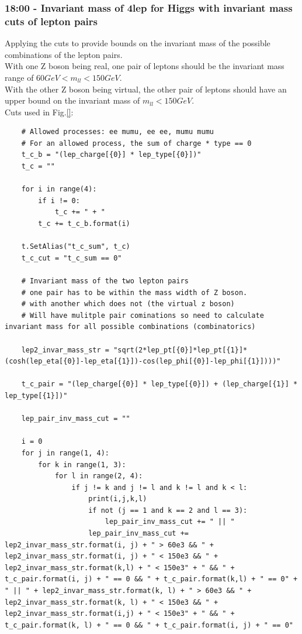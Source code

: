 \subsubsection*{18:00 - Invariant mass of 4lep for Higgs with invariant mass cuts of lepton pairs}
Applying the cuts to provide bounds on the invariant mass of the possible combinations of the lepton pairs.
\\
With one Z boson being real, one pair of leptons should be the invariant mass range of $60 GeV < m_{ll} < 150 GeV$.
\\
With the other Z boson being virtual, the other pair of leptons should have an upper bound on the invariant mass of $m_{ll} < 150 GeV$.
\\
Cuts used in Fig.\ref{}:
\begin{lstlisting}
    # Allowed processes: ee mumu, ee ee, mumu mumu
    # For an allowed process, the sum of charge * type == 0 
    t_c_b = "(lep_charge[{0}] * lep_type[{0}])"  
    t_c = ""
    
    for i in range(4):
        if i != 0:
            t_c += " + "
        t_c += t_c_b.format(i)

    t.SetAlias("t_c_sum", t_c)
    t_c_cut = "t_c_sum == 0"
    
    # Invariant mass of the two lepton pairs 
    # one pair has to be within the mass width of Z boson.
    # with another which does not (the virtual z boson)
    # Will have mulitple pair cominations so need to calculate invariant mass for all possible combinations (combinatorics)

    lep2_invar_mass_str = "sqrt(2*lep_pt[{0}]*lep_pt[{1}]*(cosh(lep_eta[{0}]-lep_eta[{1}])-cos(lep_phi[{0}]-lep_phi[{1}])))"

    t_c_pair = "(lep_charge[{0}] * lep_type[{0}]) + (lep_charge[{1}] * lep_type[{1}])"

    lep_pair_inv_mass_cut = ""

    i = 0
    for j in range(1, 4):
        for k in range(1, 3):
            for l in range(2, 4):
                if j != k and j != l and k != l and k < l:
                    print(i,j,k,l)
                    if not (j == 1 and k == 2 and l == 3):
                        lep_pair_inv_mass_cut += " || "
                    lep_pair_inv_mass_cut += lep2_invar_mass_str.format(i, j) + " > 60e3 && " + lep2_invar_mass_str.format(i, j) + " < 150e3 && " + lep2_invar_mass_str.format(k,l) + " < 150e3" + " && " + t_c_pair.format(i, j) + " == 0 && " + t_c_pair.format(k,l) + " == 0" + " || " + lep2_invar_mass_str.format(k, l) + " > 60e3 && " + lep2_invar_mass_str.format(k, l) + " < 150e3 && " + lep2_invar_mass_str.format(i,j) + " < 150e3" + " && " + t_c_pair.format(k, l) + " == 0 && " + t_c_pair.format(i, j) + " == 0"
    

\end{lstlisting}
